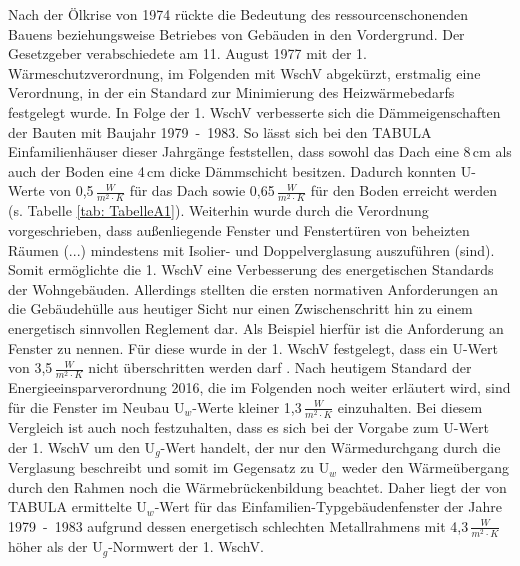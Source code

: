 Nach der Ölkrise von 1974 rückte die Bedeutung des ressourcenschonenden Bauens beziehungsweise Betriebes von Gebäuden in den Vordergrund. 
Der Gesetzgeber verabschiedete am 11. August 1977 mit der 1. Wärmeschutzverordnung, im Folgenden mit WschV abgekürzt, erstmalig eine Verordnung, in der ein Standard zur Minimierung des Heizwärmebedarfs festgelegt wurde. 
In Folge der 1. WschV verbesserte sich die Dämmeigenschaften der Bauten mit Baujahr \mbox{1979 - 1983}.
So lässt sich bei den TABULA Einfamilienhäuser dieser Jahrgänge feststellen, dass sowohl das Dach eine 8\,cm als auch der Boden eine 4\,cm dicke Dämmschicht besitzen. 
Dadurch konnten U-Werte von 0,5\,\(\frac{W}{m^2 \cdot K} \) für das Dach sowie 0,65\,\(\frac{W}{m^2 \cdot K} \) für den Boden erreicht werden (s. Tabelle \ref{tab: TabelleA1}).
Weiterhin wurde durch die Verordnung vorgeschrieben, dass \glqq außenliegende Fenster und Fenstertüren von beheizten Räumen (...) mindestens mit Isolier- und Doppelverglasung auszuführen (sind)\grqq \cite{Bundesregierung.1977}.
Somit ermöglichte die 1. WschV eine Verbesserung des energetischen Standards der Wohngebäuden. 
Allerdings stellten die ersten normativen Anforderungen an die Gebäudehülle aus heutiger Sicht nur einen Zwischenschritt hin zu einem energetisch sinnvollen Reglement dar.
Als Beispiel hierfür ist die Anforderung an Fenster zu nennen. 
Für diese wurde in der 1. WschV festgelegt, dass ein U-Wert von 3,5\,\(\frac{W}{m^2 \cdot K} \) nicht überschritten werden darf \cite{Bundesregierung.1977}.
Nach heutigem Standard der Energieeinsparverordnung 2016, die im Folgenden noch weiter erläutert wird, sind für die Fenster im Neubau U\(_w\)-Werte kleiner 1,3\,\(\frac{W}{m^2 \cdot K} \) einzuhalten.
Bei diesem Vergleich ist auch noch festzuhalten, dass es sich bei der Vorgabe zum U-Wert der 1. WschV um den U\(_g\)-Wert handelt, der nur den Wärmedurchgang durch die Verglasung beschreibt und somit im Gegensatz zu U\(_w\) weder den Wärmeübergang durch den Rahmen noch die Wärmebrückenbildung beachtet. 
Daher liegt der von TABULA ermittelte U\(_w\)-Wert für das Einfamilien-Typgebäudenfenster der Jahre \mbox{1979 - 1983} aufgrund dessen energetisch schlechten Metallrahmens mit 4,3\,\(\frac{W}{m^2 \cdot K} \) höher als der U\(_g\)-Normwert der 1. WschV. \cite{EickeHenning.2011} 

